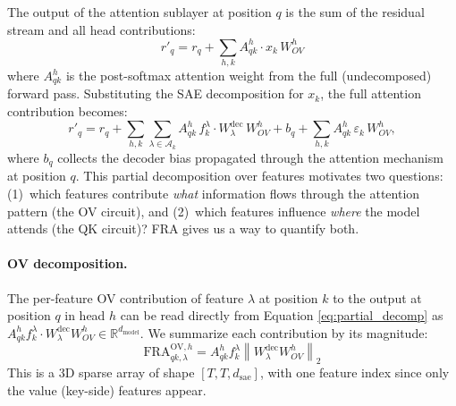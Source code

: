 \documentclass{article} %
\theoremstyle{plain}
\theoremstyle{definition}
\theoremstyle{remark}
\newcommand{\WOV}{W_{OV}}
\newcommand{\dsae}{d_{\mathrm{sae}}}
\newcommand{\RR}{\mathbb{R}}
\begin{document}
The output of the attention sublayer at position $q$ is the sum of the residual stream and all head contributions:
\begin{equation}
    r'_q = r_q + \sum_{h,k} A^h_{qk} \cdot x_k\,\WOV^h
    \label{eq:full_layer}
\end{equation}
where $A^h_{qk}$ is the post-softmax attention weight from the full (undecomposed) forward pass. Substituting the SAE decomposition for $x_k$, the full attention contribution becomes:
\begin{equation}
      r'_q = r_q
      + \sum_{h,k} \sum_{\lambda \in \mathcal{A}_k}
          A^h_{qk}\, f_k^\lambda \cdot W^{\mathrm{dec}}_\lambda\, \WOV^h
      + b_q
      + \sum_{h,k} A^h_{qk}\, \varepsilon_k\, \WOV^h,
      \label{eq:partial_decomp}
  \end{equation}
where $b_q$ collects the decoder bias propagated through the attention mechanism at position $q$. This partial decomposition over features motivates two questions: (1)~which features contribute \emph{what} information flows through the attention pattern (the OV circuit), and (2)~which features influence \emph{where} the model attends (the QK circuit)? FRA gives us a way to quantify both.

\paragraph{OV decomposition.} The per-feature OV contribution of feature $\lambda$ at position $k$ to the output at position $q$ in head $h$ can be read directly from Equation \eqref{eq:partial_decomp} as $A^h_{qk} f_k^\lambda \cdot W^{\mathrm{dec}}_\lambda \WOV^h\in\RR^{d_\text{model}}$. We summarize each contribution by its magnitude:
\begin{equation}
    \mathrm{FRA}^{\mathrm{OV},h}_{qk,\lambda} = A^h_{qk} f_k^\lambda \left\lVert W^{\mathrm{dec}}_\lambda \WOV^h \right\rVert_2
    \label{eq:ov_fra}
\end{equation}
This is a 3D sparse array of shape $[T, T, \dsae]$, with one feature index since only the value (key-side) features appear.
\end{document}
